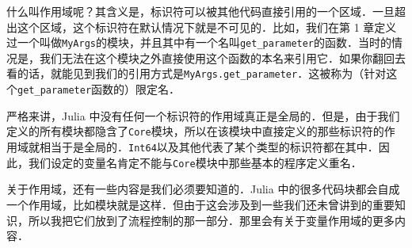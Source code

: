 什么叫作用域呢？其含义是，标识符可以被其他代码直接引用的一个区域．一旦超出这个区域，这个标识符在默认情况下就是不可见的．比如，我们在第 1 章定义过一个叫做\verb|MyArgs|的模块，并且其中有一个名叫\verb|get_parameter|的函数．当时的情况是，我们无法在这个模块之外直接使用这个函数的本名来引用它．如果你翻回去看的话，就能见到我们的引用方式是\verb|MyArgs.get_parameter|．这被称为（针对这个\verb|get_parameter|函数的）限定名．

严格来讲，Julia 中没有任何一个标识符的作用域真正是全局的．但是，由于我们定义的所有模块都隐含了\verb|Core|模块，所以在该模块中直接定义的那些标识符的作用域就相当于是全局的．\verb|Int64|以及其他代表了某个类型的标识符都在其中．因此，我们设定的变量名肯定不能与\verb|Core|模块中那些基本的程序定义重名．

关于作用域，还有一些内容是我们必须要知道的．Julia 中的很多代码块都会自成一个作用域，比如模块就是这样．但由于这会涉及到一些我们还未曾讲到的重要知识，所以我把它们放到了流程控制的那一部分．那里会有关于变量作用域的更多内容．